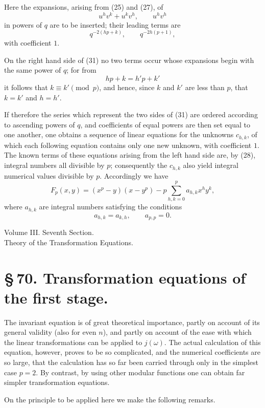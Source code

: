 \documentclass[11pt]{article}
\begin{document}
Here the expansions, arising from (25) and (27), of
\[
u^hv^k+u^kv^h,
\qquad
u^hv^h
\]
in powers of $q$ are to be inserted; their leading terms are
\[
q^{-2(hp+k)},
\qquad
q^{-2h(p+1)},
\]
with coefficient $1$.

On the right hand side of (31) no two terms occur whose expansions begin with the same power of $q$; for from
\[
hp+k=h'p+k'
\]
it follows that $k\equiv k'\pmod p$, and hence, since $k$ and $k'$ are less than $p$, that $k=k'$ and $h=h'$.

If therefore the series which represent the two sides of (31) are ordered according to ascending powers of $q$, and coefficients of equal powers are then set equal to one another, one obtains a sequence of linear equations for the unknowns $c_{h,k}$, of which each following equation contains only one new unknown, with coefficient $1$. The known terms of these equations arising from the left hand side are, by (28), integral numbers all divisible by $p$; consequently the $c_{h,k}$ also yield integral numerical values divisible by $p$. Accordingly we have
\begin{equation}
F_p(x,y)=(x^p-y)(x-y^p)-p\sum_{h,k=0}^{p}a_{h,k}x^hy^k,
\tag{32}
\end{equation}
where $a_{h,k}$ are integral numbers satisfying the conditions
\[
a_{h,k}=a_{k,h},
\qquad
 a_{p,p}=0.
\]


\clearpage

\begin{center}
{\large Volume III. Seventh Section.}\\[0.5em]
{\Large Theory of the Transformation Equations.}
\end{center}

\section*{\S\,70. Transformation equations of the first stage.}

The invariant equation is of great theoretical importance, partly on account of its general validity (also for even $n$), and partly on account of the ease with which the linear transformations can be applied to $j(\omega)$. The actual calculation of this equation, however, proves to be so complicated, and the numerical coefficients are so large, that the calculation has so far been carried through only in the simplest case $p=2$. By contrast, by using other modular functions one can obtain far simpler transformation equations.

On the principle to be applied here we make the following remarks.
\end{document}
